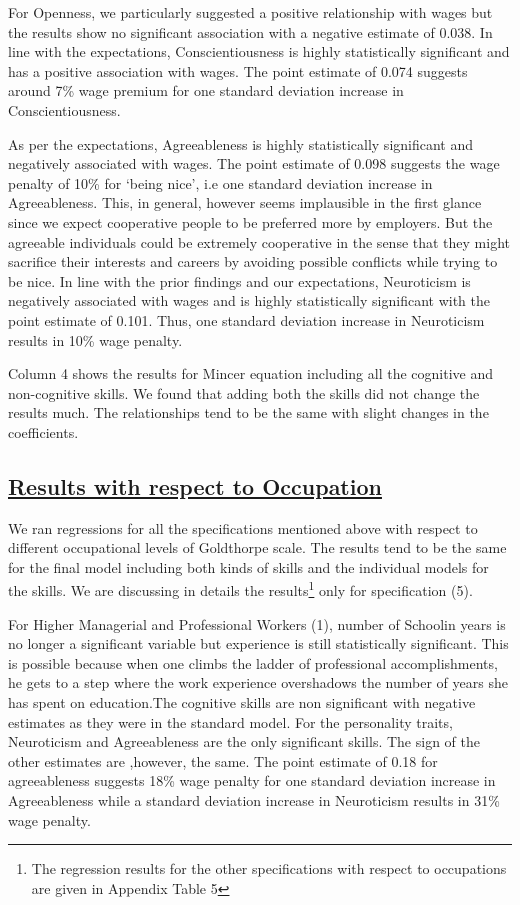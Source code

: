 \documentclass[11pt, a4paper, leqno]{article}
\begin{document}
For Openness, we particularly suggested a positive relationship with wages but the results show no significant association with a negative estimate of 0.038. In line with the expectations, Conscientiousness is highly statistically significant and has a positive association with wages. The point estimate of 0.074 suggests around 7\% wage premium for one standard deviation increase in Conscientiousness. \par
As per the expectations, Agreeableness is highly statistically significant and negatively associated with wages. The point estimate of 0.098 suggests the wage penalty of 10\% for ‘being nice’, i.e one standard deviation increase in Agreeableness. 
This, in general, however seems implausible in the first glance since we expect cooperative people to be preferred more by employers. But the agreeable individuals could be extremely cooperative in the sense that they might sacrifice their interests and careers by avoiding possible conflicts while trying to be nice. 
In line with the prior findings and our expectations, Neuroticism is negatively associated with wages and is highly statistically significant with the point estimate of 0.101. Thus, one standard deviation increase in Neuroticism results in 10\% wage penalty. \par
Column 4 shows the results for Mincer equation including all the cognitive and non-cognitive skills. We found that adding both the skills did not change the results much. The relationships tend to be the same with slight changes in the coefficients. 

\subsection*{\underline{Results with respect to  Occupation}}
We ran regressions for all the specifications mentioned above with respect to different occupational levels of Goldthorpe scale. The results tend to be the same for the final model including both kinds of skills and the individual models for the skills. We are discussing in details the results\footnote{The regression results for the other specifications with respect to occupations are given in Appendix Table 5} only for specification (5).  \par
For Higher  Managerial and Professional Workers (1), number of Schoolin years is no longer a significant variable but experience is still statistically significant.  This is possible because when one climbs the ladder of professional accomplishments, he gets to a step where the work experience overshadows the number of years she has spent on education.The cognitive skills are non significant with negative estimates as they were in the standard model. For the personality traits, Neuroticism and Agreeableness are the only significant skills. The sign of the other estimates are ,however, the same.  The point estimate of 0.18 for agreeableness suggests 18\% wage penalty for one standard deviation increase in Agreeableness while a standard deviation increase in Neuroticism results in 31\% wage penalty.\par
\end{document}
